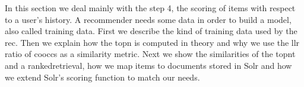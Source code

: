 In this section we deal mainly with the step 4, the scoring of items with respect to a user's history.
A recommender needs some data in order to build a model, also called training data. 
First we describe the kind of training data used by the \gls{rec}. 
Then we explain how the \gls{topn} is computed in theory and why we use the \gls{llr} ratio of \glspl{coocc} as a similarity metric.
Next we show the similarities of the \gls{topnt} and a \gls{rankedretrieval}, how we map items to documents stored in Solr and how we extend Solr's scoring function to match our needs.






